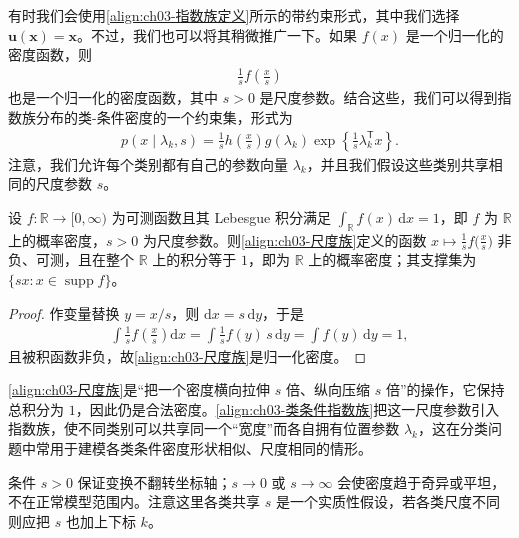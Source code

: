 \documentclass[../../main.tex]{subfiles}
\begin{document}
有时我们会使用\eqref{align:ch03-指数族定义}所示的带约束形式，其中我们选择 $\boldsymbol{u}(\boldsymbol{x})=\boldsymbol{x}$。不过，我们也可以将其稍微推广一下。如果 $f(x)$ 是一个归一化的密度函数，则
\begin{align}
\frac{1}{s}f\left(\frac{x}{s}\right)
\label{align:ch03-尺度族}
\end{align}
也是一个归一化的密度函数，其中 $s>0$ 是尺度参数。结合这些，我们可以得到指数族分布的类-条件密度的一个约束集，形式为
\begin{align}
p(x\mid\lambda_k,s)=\frac{1}{s}h\left(\frac{x}{s}\right)g(\lambda_k)\exp\left\{\frac{1}{s}\lambda_k^{\mathsf{T}}x\right\}.
\label{align:ch03-类条件指数族}
\end{align}
注意，我们允许每个类别都有自己的参数向量 $\lambda_k$，并且我们假设这些类别共享相同的尺度参数 $s$。

\begin{proposition}[尺度变换保持归一化]\label{proposition:ch03-尺度变换}
设 $f:\mathbb{R}\to[0,\infty)$ 为可测函数且其 Lebesgue 积分满足 $\int_{\mathbb{R}}f(x)\,\mathrm{d}x=1$，即 $f$ 为 $\mathbb{R}$ 上的概率密度，$s>0$ 为尺度参数。则\eqref{align:ch03-尺度族}定义的函数 $x\mapsto\frac{1}{s}f\bigl(\frac{x}{s}\bigr)$ 非负、可测，且在整个 $\mathbb{R}$ 上的积分等于 $1$，即为 $\mathbb{R}$ 上的概率密度；其支撑集为 $\{sx:x\in\operatorname{supp}f\}$。
\end{proposition}
\begin{proof}
作变量替换 $y=x/s$，则 $\mathrm{d}x=s\,\mathrm{d}y$，于是
\begin{align*}
\int\frac{1}{s}f\left(\frac{x}{s}\right)\mathrm{d}x=\int\frac{1}{s}f(y)\,s\,\mathrm{d}y=\int f(y)\,\mathrm{d}y=1,
\end{align*}
且被积函数非负，故\eqref{align:ch03-尺度族}是归一化密度。
\end{proof}

\begin{remark}
\eqref{align:ch03-尺度族}是“把一个密度横向拉伸 $s$ 倍、纵向压缩 $s$ 倍”的操作，它保持总积分为 $1$，因此仍是合法密度。\eqref{align:ch03-类条件指数族}把这一尺度参数引入指数族，使不同类别可以共享同一个“宽度”而各自拥有位置参数 $\lambda_k$，这在分类问题中常用于建模各类条件密度形状相似、尺度相同的情形。

条件 $s>0$ 保证变换不翻转坐标轴；$s\to0$ 或 $s\to\infty$ 会使密度趋于奇异或平坦，不在正常模型范围内。注意这里各类共享 $s$ 是一个实质性假设，若各类尺度不同则应把 $s$ 也加上下标 $k$。
\end{remark}
\end{document}
